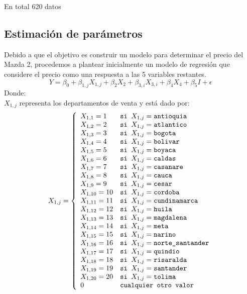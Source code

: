 \documentclass[a4paper]{article}
\begin{document}
En total 620 datos

\subsection{Estimación de parámetros}
Debido a que el objetivo es construir un modelo para determinar el precio del Mazda 2, procedemos a plantear inicialmente un modelo de regresión que considere el precio como una respuesta a las 5  variables restantes.
\begin{equation}
Y= \beta_0+\beta_{1,j}X_{1,j}+\beta_2X_2 +\beta_{3,i}X_{3,i}+\beta_4X_4+\beta_5I+\epsilon
\end{equation}
Donde:\\
$X_{1,j}$ representa los departamentos de venta y está dado por:
\begin{equation}
X_{1,j} = \left\lbrace
\begin{array}{ll}
X_{1,1} = 1 & \verb!si ! X_{1,j} = \verb!antioquia!\\
X_{1,2} = 2 & \verb!si !X_{1,j} = \verb!atlantico!\\
X_{1,3} = 3 & \verb!si !X_{1,j} = \verb!bogota!\\
X_{1,4} = 4 & \verb!si !X_{1,j} = \verb!bolivar!\\
X_{1,5} = 5 & \verb!si !X_{1,j} = \verb!boyaca!\\
X_{1,6} = 6 & \verb!si !X_{1,j} = \verb!caldas!\\
X_{1,7} = 7 & \verb!si !X_{1,j} = \verb!casanare!\\
X_{1,8} = 8 & \verb!si !X_{1,j} = \verb!cauca!\\
X_{1,9} = 9 & \verb!si !X_{1,j} = \verb!cesar!\\
X_{1,10} = 10 & \verb!si !X_{1,j} = \verb!cordoba!\\
X_{1,11} = 11 & \verb!si !X_{1,j} = \verb!cundinamarca!\\
X_{1,12} = 12 & \verb!si !X_{1,j} = \verb!huila!\\
X_{1,13} = 13 & \verb!si !X_{1,j} = \verb!magdalena!\\
X_{1,14} = 14 & \verb!si !X_{1,j} = \verb!meta!\\
X_{1,15} = 15 & \verb!si !X_{1,j} = \verb!narino!\\
X_{1,16} = 16 & \verb!si !X_{1,j} = \verb!norte_santander!\\
X_{1,17} = 17 & \verb!si !X_{1,j} = \verb!quindio!\\
X_{1,18} = 18 & \verb!si !X_{1,j} = \verb!risaralda!\\
X_{1,19} = 19 & \verb!si !X_{1,j} = \verb!santander!\\
X_{1,20} = 20 & \verb!si !X_{1,j} = \verb!tolima!\\
0 & \verb!cualquier otro valor!\\
\end{array}
\right.
\end{equation}
\end{document}
